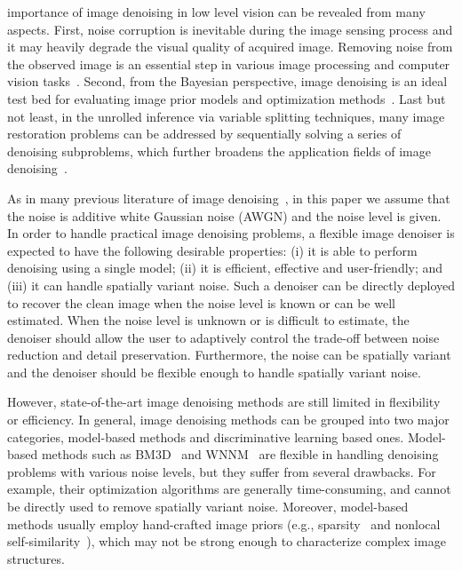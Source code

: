 \documentclass[journal]{IEEEtran}
\begin{document}
 importance of image denoising in low level vision can be revealed from many aspects.
First, noise corruption is inevitable during the image sensing process and it may heavily degrade the visual quality of acquired image. Removing noise from the observed image is an essential step in various image processing and computer vision tasks~\cite{andrews1977digital,chatterjee2010denoising}.
Second, from the Bayesian perspective, image denoising is an ideal test bed for evaluating image prior models and optimization methods~\cite{roth2005fields,zoran2011learning,gu2014weighted}.
Last but not least, in the unrolled inference via variable splitting techniques, many image restoration problems can be addressed by sequentially solving a series of denoising subproblems, which further broadens the application fields of image denoising~\cite{afonso2010fast,heide2014flexisp,romano2016little,zhang2017learning}.


As in many previous literature of image denoising~\cite{portilla2003image,dabov2007image,mairal2009non,dong2013nonlocally}, in this paper we assume that the noise is additive white Gaussian noise (AWGN) and the noise level is given. In order to handle practical image denoising problems, a flexible image denoiser is expected to have the following desirable properties: (i) it is able to perform denoising using a single model; (ii) it is efficient, effective and user-friendly; and (iii) it can handle spatially variant noise. Such a denoiser can be directly deployed to recover the clean image when the noise level is known or can be well estimated. When the noise level is unknown or is difficult to estimate, the denoiser should allow the user to adaptively control the trade-off between noise reduction and detail preservation. Furthermore, the noise can be spatially variant and the denoiser should be flexible enough to handle spatially variant noise.


However, state-of-the-art image denoising methods are still limited in flexibility or efficiency. In general, image denoising methods can be grouped into two major categories, model-based methods and discriminative learning based ones. Model-based methods such as BM3D~\cite{dabov2007image} and WNNM~\cite{gu2014weighted} are flexible in handling denoising problems with various noise levels, but they suffer from several drawbacks. For example, their optimization algorithms are generally time-consuming, and cannot be directly used to remove spatially variant noise. Moreover,
model-based methods usually employ hand-crafted image priors (e.g., sparsity~\cite{elad2006image,mairal2008sparse} and nonlocal self-similarity~\cite{buades2005non,mairal2009non,dong2013nonlocally}), which may not be strong enough to characterize complex image structures.
\end{document}
